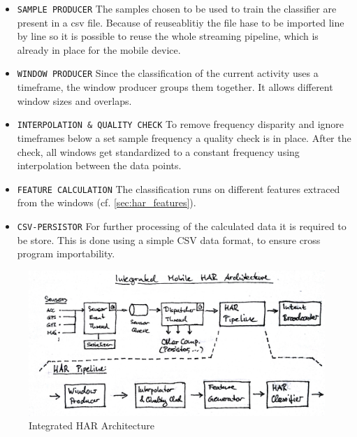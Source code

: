 \begin{itemize}
  \item \texttt{SAMPLE PRODUCER} The samples chosen to be used to train the 
    classifier are present in a csv file. Because of reuseablitiy the file hase 
    to be imported line by line so it is possible to reuse the whole streaming
    pipeline, which is already in place for the mobile device.
  \item \texttt{WINDOW PRODUCER} Since the classification of the current 
    activity uses a timeframe, the window producer groups them together. It
    allows different window sizes and overlaps.
  \item \texttt{INTERPOLATION \& QUALITY CHECK} To remove frequency disparity 
    and ignore timeframes below a set sample frequency a quality check is in 
    place. After the check, all windows get standardized to a constant frequency
    using interpolation between the data points.
  \item \texttt{FEATURE CALCULATION} The classification runs on different 
    features extraced from the windows (cf. \ref{sec:har_features}).
  \item \texttt{CSV-PERSISTOR} For further processing of the calculated data
    it is required to be store. This is done using a simple CSV data format,
    to ensure cross program importability.
\end{itemize}

\begin{figure}[htbp]
\centering
\includegraphics[width=\textwidth]{img/har/integration.jpg}
\caption{Integrated HAR Architecture}\label{fig:integrated_har}
\end{figure}

